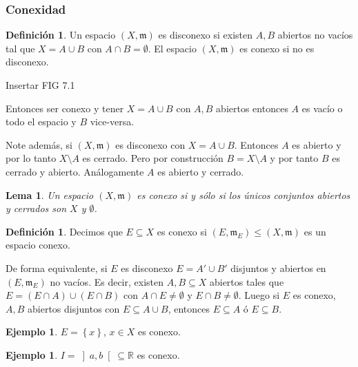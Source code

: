 \documentclass[12pt]{article}
\theoremstyle{plain}
\newtheorem{Lem}[Th]{Lema}             %
\theoremstyle{definition}
\newtheorem{Def}[Th]{Definición}       %
\newtheorem{Ex}[Th]{Ejemplo}               %
\theoremstyle{remark}
\numberwithin{equation}{section}
\newcommand{\bR}{\mathbb{R}}        %
\newcommand{\mm}{\mathfrak{m}}      %
\renewcommand{\leq}{\leqslant}      %
\renewcommand{\:}{\colon}           %
\newcommand{\conj}[1]{\left\lbrace#1\right\rbrace}
\newcommand{\obonj}[1]{\left\rbrack#1\right\lbrack}
\begin{document}
\begin{multicols}{2}
\begin{ptcb}
\end{ptcb}

\subsubsection*{Conexidad}

\begin{Def}
  Un espacio $(X,\mm)$ es disconexo si existen $A,B$ abiertos no vacíos tal que $X=A\cup B$ con $A\cap B=\emptyset$. El espacio $(X,\mm)$ es conexo si no es disconexo.
\end{Def}
Insertar FIG 7.1\par
Entonces ser conexo y tener $X=A\cup B$ con $A,B$ abiertos entonces $A$ es vacío o todo el espacio y $B$ vice-versa. \par

Note además, si $(X,\mm)$ es disconexo con $X=A\cup B$. Entonces $A$ es abierto y por lo tanto $X\setminus A$ es cerrado. Pero por construcción $B=X\setminus A$ y por tanto $B$ es cerrado y abierto. Análogamente $A$ es abierto y cerrado.
\begin{Lem}
  Un espacio $(X,\mm)$ es conexo si y sólo si los únicos conjuntos abiertos y cerrados son $X$ y $\emptyset$.
\end{Lem}

\begin{Def}
  Decimos que $E\subseteq X$ es conexo si $(E,\mm_E)\leq (X,\mm)$ es un espacio conexo.
\end{Def}

De forma equivalente, si $E$ es disconexo $E=A'\cup B'$ disjuntos y abiertos en $(E,\mm_E)$ no vacíos. Es decir, existen $A,B\subseteq X$ abiertos tales que $E=(E\cap A)\cup (E\cap B)$ con $A\cap E\neq \emptyset$ y $E\cap B\neq \emptyset$. Luego si $E$ es conexo, $A,B$ abiertos disjuntos con $E\subseteq A\cup B$, entonces $E\subseteq A$ ó $E\subseteq B$.

\begin{Ex}
  $E=\conj{x}$, $x\in X$ es conexo.
\end{Ex}

\begin{Ex}
  $I=\obonj{a,b}\subseteq\bR$ es conexo.
\end{Ex}


\end{multicols}
\end{document}
